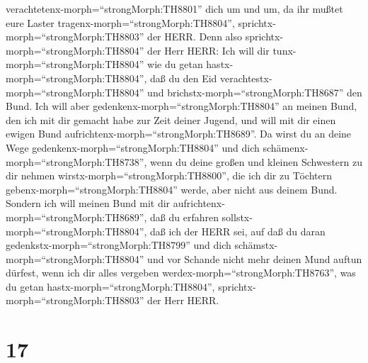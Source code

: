verachtetenx-morph=``strongMorph:TH8801'' dich um und um, 
da ihr mußtet eure Laster tragenx-morph=``strongMorph:TH8804'',
sprichtx-morph=``strongMorph:TH8803'' der HERR.  Denn also
sprichtx-morph=``strongMorph:TH8804'' der Herr HERR: Ich will dir
tunx-morph=``strongMorph:TH8804'' wie du getan
hastx-morph=``strongMorph:TH8804'', daß du den Eid
verachtestx-morph=``strongMorph:TH8804'' und
brichstx-morph=``strongMorph:TH8687'' den Bund.  Ich will
aber gedenkenx-morph=``strongMorph:TH8804'' an meinen Bund, den ich mit
dir gemacht habe zur Zeit deiner Jugend, und will mit dir einen ewigen
Bund aufrichtenx-morph=``strongMorph:TH8689''.  Da wirst du
an deine Wege gedenkenx-morph=``strongMorph:TH8804'' und dich
schämenx-morph=``strongMorph:TH8738'', wenn du deine großen und kleinen
Schwestern zu dir nehmen wirstx-morph=``strongMorph:TH8800'', die ich
dir zu Töchtern gebenx-morph=``strongMorph:TH8804'' werde, aber nicht
aus deinem Bund.  Sondern ich will meinen Bund mit dir
aufrichtenx-morph=``strongMorph:TH8689'', daß du erfahren
sollstx-morph=``strongMorph:TH8804'', daß ich der HERR sei,
 auf daß du daran gedenkstx-morph=``strongMorph:TH8799''
und dich schämstx-morph=``strongMorph:TH8804'' und vor Schande nicht
mehr deinen Mund auftun dürfest, wenn ich dir alles vergeben
werdex-morph=``strongMorph:TH8763'', was du getan
hastx-morph=``strongMorph:TH8804'',
sprichtx-morph=``strongMorph:TH8803'' der Herr HERR.

\hypertarget{section-16}{%
\section{17}\label{section-16}}


